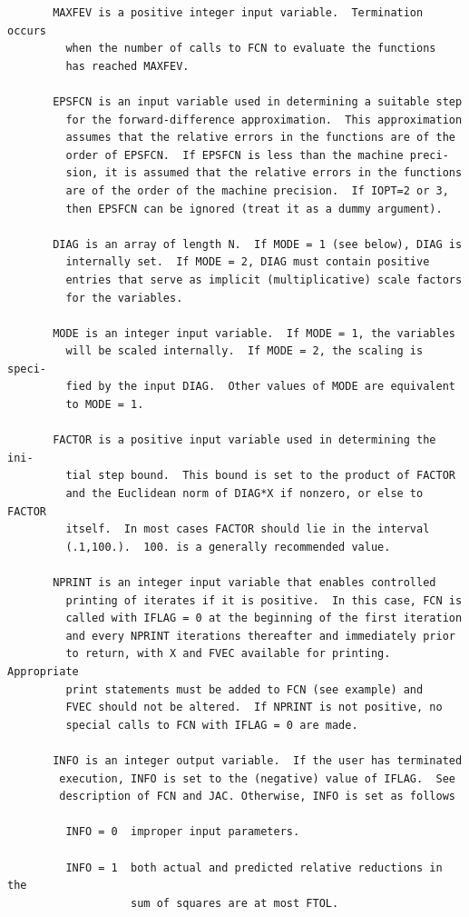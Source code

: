 \documentclass[11pt,twoside]{article}
\begin{document}
\begin{verbatim}
       MAXFEV is a positive integer input variable.  Termination occurs
         when the number of calls to FCN to evaluate the functions
         has reached MAXFEV.

       EPSFCN is an input variable used in determining a suitable step
         for the forward-difference approximation.  This approximation
         assumes that the relative errors in the functions are of the
         order of EPSFCN.  If EPSFCN is less than the machine preci-
         sion, it is assumed that the relative errors in the functions
         are of the order of the machine precision.  If IOPT=2 or 3,
         then EPSFCN can be ignored (treat it as a dummy argument).

       DIAG is an array of length N.  If MODE = 1 (see below), DIAG is
         internally set.  If MODE = 2, DIAG must contain positive
         entries that serve as implicit (multiplicative) scale factors
         for the variables.

       MODE is an integer input variable.  If MODE = 1, the variables
         will be scaled internally.  If MODE = 2, the scaling is speci-
         fied by the input DIAG.  Other values of MODE are equivalent
         to MODE = 1.

       FACTOR is a positive input variable used in determining the ini-
         tial step bound.  This bound is set to the product of FACTOR
         and the Euclidean norm of DIAG*X if nonzero, or else to FACTOR
         itself.  In most cases FACTOR should lie in the interval
         (.1,100.).  100. is a generally recommended value.

       NPRINT is an integer input variable that enables controlled
         printing of iterates if it is positive.  In this case, FCN is
         called with IFLAG = 0 at the beginning of the first iteration
         and every NPRINT iterations thereafter and immediately prior
         to return, with X and FVEC available for printing. Appropriate
         print statements must be added to FCN (see example) and
         FVEC should not be altered.  If NPRINT is not positive, no
         special calls to FCN with IFLAG = 0 are made.

       INFO is an integer output variable.  If the user has terminated
        execution, INFO is set to the (negative) value of IFLAG.  See
        description of FCN and JAC. Otherwise, INFO is set as follows

         INFO = 0  improper input parameters.

         INFO = 1  both actual and predicted relative reductions in the
                   sum of squares are at most FTOL.


\end{verbatim}
\end{document}
